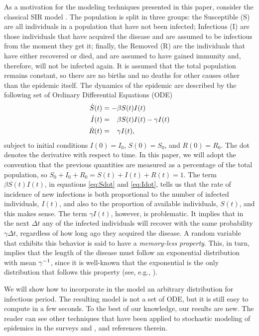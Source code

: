 \documentclass[USenglish,10pt]{article}
\newcommand{\eg}{e.g.\xspace}
\newcommand{\gami}{\ensuremath\gamma^{-1}\xspace}
\newcommand{\phm}{\ensuremath\phantom{-}\xspace}
\begin{document}
As a motivation for the modeling techniques presented in this paper, consider the classical SIR model \cite{kerm.mcke27,murr07,chas09}. The population is split in three groups: the Susceptible (S) are all individuals in a population that have not been infected; Infectious (I) are those individuals that have acquired the disease and are assumed to be infectious from the moment they get it; finally, the Removed (R) are the individuals that have either recovered or died, and are assumed to have gained immunity and, therefore, will not be infected again. It is assumed that the total population remains constant, so there are no births and no deaths for other causes other than the epidemic itself.
The dynamics of the epidemic are described by the following set of Ordinary Differential Equations (ODE)
\begin{subequations}
	\begin{align}
		\dot{S}(t) &= -\beta S(t)I(t)  \label{eq:Sdot} \\
		\dot{I}(t) &= \phm\beta S(t)I(t) - \gamma I(t) \label{eq:Idot}  \\
		\dot{R}(t) &= \phm\gamma I(t), \label{eq:Rdot}
	\end{align}
\end{subequations}
subject to initial conditions $I(0)=I_0$, $S(0)=S_0$, and $R(0)=R_0$. The dot denotes the derivative with respect to time. In this paper, we will adopt the convention that the previous quantities are measured as a percentage of the total population, so $S_0+I_0+R_0=S(t)+I(t)+R(t)=1$.
The term $\beta S(t)I(t)$, in equations \eqref{eq:Sdot} and \eqref{eq:Idot}, tells us that the rate of incidence of new infections is both proportional to the number of infected individuals, $I(t)$, and also to the proportion of available individuals, $S(t)$, and this makes sense.
The term $\gamma I(t)$, however, is problematic. It implies that in the next $\Delta t$ any of the infected individuals will recover with the same probability $\gamma \Delta t$, regardless of how long ago they acquired the disease.
A random variable that exhibits this behavior is said to have a \emph{memory-less property}.
This, in turn, implies that the length of the disease must follow an exponential distribution with mean $\gami$, since it is well-known that the exponential is the only distribution that follows this property (see, \eg, \cite{kulk95}).

We will show how to incorporate in the model an arbitrary distribution for infectious period.
The resulting model is not a set of ODE, but it is still easy to compute in a few seconds.
To the best of our knowledge, our results are new.
The reader can see other techniques that have been applied to stochastic modeling of epidemics in the surveys \cite{lefe90} and \cite{dale.gani01}, and references therein.
\end{document}
